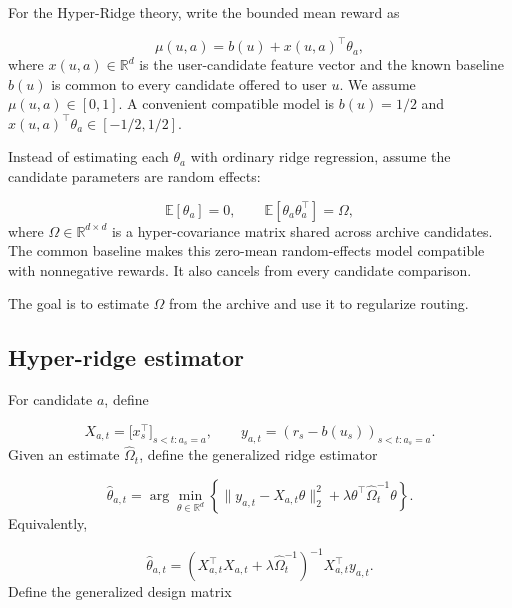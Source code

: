 \documentclass{article} %
\begin{document}
For the Hyper-Ridge theory, write the bounded mean reward as

\begin{equation}
\mu(u,a)=b(u)+x(u,a)^\top\theta_a ,
\end{equation}
where $x(u,a)\in\mathbb{R}^d$ is the user-candidate feature vector and the known baseline $b(u)$ is common to every candidate offered to user $u$. We assume $\mu(u,a)\in[0,1]$. A convenient compatible model is $b(u)=1/2$ and $x(u,a)^\top\theta_a\in[-1/2,1/2]$.

Instead of estimating each $\theta_a$ with ordinary ridge regression, assume
the candidate parameters are random effects:

\begin{equation}
\mathbb{E}[\theta_a]=0,\qquad
\mathbb{E}[\theta_a\theta_a^\top]=\Omega,
\end{equation}
where $\Omega \in \mathbb{R}^{d \times d}$ is a hyper-covariance matrix shared
across archive candidates. The common baseline makes this zero-mean random-effects model compatible with nonnegative rewards. It also cancels from every candidate comparison.

The goal is to estimate $\Omega$ from the archive and use it to regularize
routing.

\subsection{Hyper-ridge estimator}

For candidate $a$, define

\begin{equation}
X_{a,t} = \bigl[ x_s^\top \bigr]_{s < t : a_s = a}, \qquad
y_{a,t} = (r_s-b(u_s))_{s < t : a_s = a}.
\end{equation}
Given an estimate $\widehat{\Omega}_t$, define the generalized ridge estimator

\begin{equation}
\widehat{\theta}_{a,t}
= \arg\min_{\theta \in \mathbb{R}^d}
\left\{ \| y_{a,t} - X_{a,t}\theta \|_2^2
      + \lambda \theta^\top \widehat{\Omega}_t^{-1} \theta \right\}.
\end{equation}
Equivalently,

\begin{equation}
\label{eq:hyper-theta-hat}
\widehat{\theta}_{a,t}
= \left( X_{a,t}^\top X_{a,t} + \lambda \widehat{\Omega}_t^{-1} \right)^{-1}
  X_{a,t}^\top y_{a,t}.
\end{equation}
Define the generalized design matrix
\end{document}
